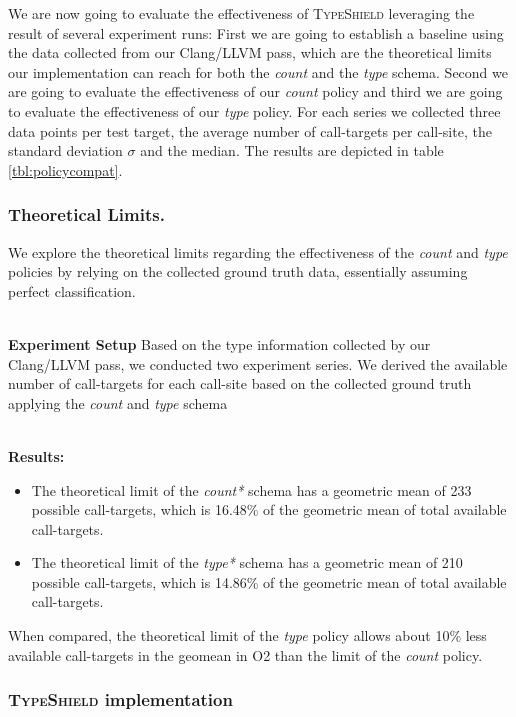 We are now going to evaluate the effectiveness of \textsc{TypeShield} leveraging the result of several experiment runs: First we are going to establish a baseline using the data 
collected from our Clang/LLVM pass, which are the theoretical limits our implementation can reach for both the \textit{count} and the \textit{type} schema. Second we are going to evaluate the effectiveness of our \textit{count} 
policy and third we are going to evaluate the effectiveness of our \textit{type} policy. For each series we collected three data points per test target, the average number of call-targets per call-site, the standard deviation $\sigma$ and the median. The results are depicted in table \ref{tbl:policycompat}. 

\subsubsection{Theoretical Limits.}
\label{subsection:theoreticallimit}
We explore the theoretical limits regarding the effectiveness of the \textit{count} and \textit{type} policies by relying on the collected ground truth data, essentially assuming perfect classification.

~\\
\textbf{Experiment Setup} Based on the type information collected by our Clang/LLVM pass, we conducted two experiment series.
We derived the available number of call-targets for each call-site based on the collected ground truth applying the \textit{count} and \textit{type} schema


~\\
\textbf{Results:}
\begin{itemize}
\item The theoretical limit of the \textit{count*} schema has a geometric mean of 233 possible call-targets, which is 16.48\% of the geometric mean of total available 
call-targets.
\item The theoretical limit of the \textit{type*} schema has a geometric mean of 210 possible call-targets, which is 14.86\% of the geometric mean of total available
call-targets.
\end{itemize}

When compared, the theoretical limit of the \textit{type} policy allows about 10\% less available call-targets in the geomean in O2 than the limit of the \textit{count} policy.

\subsubsection{\textsc{TypeShield} implementation}
\label{subsection:typeshieldvslimitcount}

